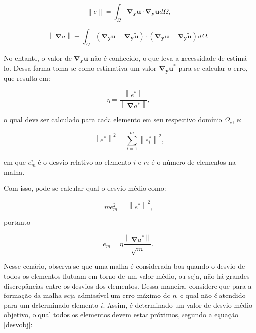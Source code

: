 \documentclass[_ArquivoPrincipal.tex]{subfiles}
\begin{document}
\begin{equation}
    \left\lVert e\right\lVert=\int_{\Omega}{\mathbf{\nabla_y u}\cdot\mathbf{\nabla_y u}d\Omega}\text{,}
    \label{norme}
\end{equation}

\begin{equation}
    \left\lVert\mathbf{\nabla}a\right\lVert=\int_{\Omega}{(\mathbf{\nabla_y u}-\mathbf{\nabla_y\tilde{u}})\cdot(\mathbf{\nabla_y u}-\mathbf{\nabla_y\tilde{u}})d\Omega}\text{.}
    \label{normu}
\end{equation}

No entanto, o valor de $\mathbf{\nabla_y u}$ não é conhecido, o que leva a necessidade de estimá-lo. Dessa forma toma-se como estimativa um valor $\mathbf{\nabla_y u}^*$ para se calcular o erro, que resulta em:

\begin{equation}
    \eta=\frac{\left\lVert e^*\right\lVert}{\left\lVert\mathbf{\nabla}a^*\right\lVert}\text{,}
    \label{errorelest}
\end{equation}

\noindent o qual deve ser calculado para cada elemento em seu respectivo domínio $\Omega_e$, e:

\begin{equation}
    \left\lVert e^*\right\lVert^2=\sum_{i=1}^{m}{\left\lVert e_i^*\right\lVert^2}\text{,}
    \label{norme-2}
\end{equation}

\noindent em que $e^i_m$ é o desvio relativo ao elemento $i$ e $m$ é o número de elementos na malha.

Com isso, pode-se calcular qual o desvio médio como:

\begin{equation}
    me^2_m=\left\lVert e^*\right\lVert^2\text{,}
    \label{emed}
\end{equation}

\noindent portanto

\begin{equation}
    e_m=\eta\frac{\left\lVert\mathbf{\nabla}a^*\right\lVert}{\sqrt{m}}\text{.}
    \label{emed-2}
\end{equation}

Nesse cenário, observa-se que uma malha é considerada boa quando o desvio de todos os elementos flutuam em torno de um valor médio, ou seja, não há grandes discrepâncias entre os desvios dos elementos. Dessa maneira, considere que para a formação da malha seja admissível um erro máximo de $\bar{\eta}$, o qual não é atendido para um determinado elemento $i$. Assim, é determinado um valor de desvio médio objetivo, o qual todos os elementos devem estar próximos, segundo a equação \ref{desvobj}:
\end{document}

